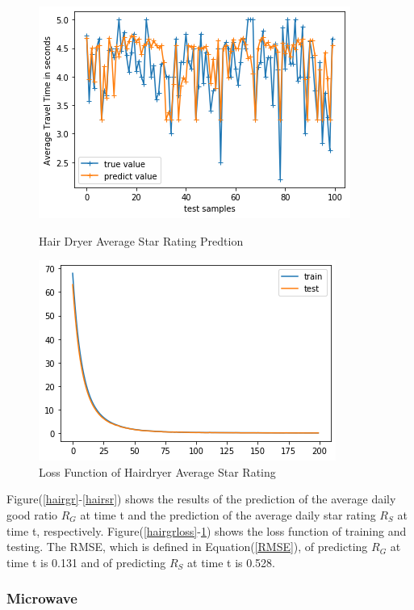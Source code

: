 \documentclass[12pt]{article}
\begin{document}
\begin{figure}[!htb]
   \begin{minipage}{0.48\textwidth}
     \centering
     \includegraphics[width=.8\linewidth]{rate_RMSE0528.png} %
     \caption{Hair Dryer Average Star Rating Predtion}\label{hairsr}
   \end{minipage}\hfill
   \begin{minipage}{0.48\textwidth}
     \centering
     \includegraphics[width=.8\linewidth]{loss.png}
     \caption{Loss Function of Hairdryer Average Star Rating}\label{hairsrloss}
   \end{minipage}
\end{figure} 

Figure(\ref{hairgr}-\ref{hairsr}) shows the results of the prediction of the average daily good ratio $R_{G}$ at time t and the prediction of the average daily star rating $R_{S}$ at time t, respectively. Figure(\ref{hairgrloss}-\ref{hairsrloss}) shows the loss function of training and testing. The RMSE, which is defined in Equation(\ref{RMSE}), of predicting $R_{G}$ at time t is 0.131 and of predicting $R_{S}$ at time t is 0.528. 

\subsubsection{Microwave}
\end{document}
